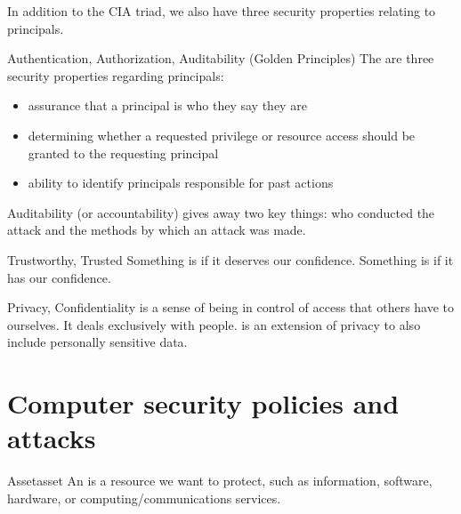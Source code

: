 \documentclass[code]{amznotes}
\begin{document}
In addition to the CIA triad, we also have three security properties relating to principals.
\begin{dfnbox}{Authentication, Authorization, Auditability (Golden Principles)}{}
    The  are three security properties regarding principals:

    \begin{itemize}[noitemsep]
        \item {} assurance that a principal is who they say they are
        \item {} determining whether a requested privilege or resource access should be granted to the requesting principal
        \item {} ability to identify principals responsible for past actions
    \end{itemize}

\end{dfnbox}

Auditability (or accountability) gives away two key things: who conducted the attack and the methods by which an attack was made.

\begin{dfnbox}{Trustworthy, Trusted}{}
    Something is  if it deserves our confidence.     Something is  if it has our confidence.

\end{dfnbox}

\begin{dfnbox}{Privacy, Confidentiality}{}
     is a sense of being in control of access that others have to ourselves. It deals exclusively with people.  is an extension of privacy to also include personally sensitive data.
\end{dfnbox}

\section{Computer security policies and attacks}

\begin{dfnbox}{Asset}{asset}
    An  is a resource we want to protect, such as information, software, hardware, or computing/communications services.
\end{dfnbox}
\end{document}
